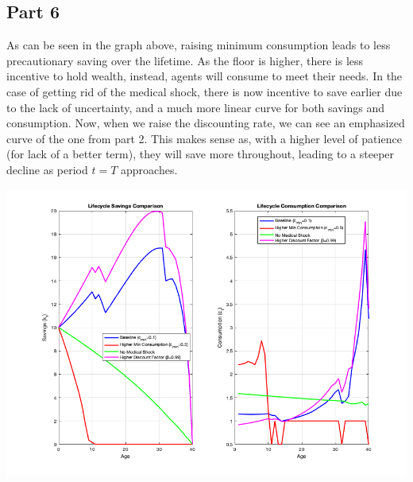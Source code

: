 \documentclass[10pt,a4paper]{article}
\begin{document}
\subsection*{Part 6}


As can be seen in the graph above, raising minimum consumption leads to less precautionary saving over the lifetime. As the floor is higher, there is less incentive to hold wealth, instead, agents will consume to meet their needs. In the case of getting rid of the medical shock, there is now incentive to save earlier due to the lack of uncertainty, and a much more linear curve for both savings and consumption. Now, when we raise the discounting rate, we can see an emphasized curve of the one from part 2. This makes sense as, with a higher level of patience (for lack of a better term), they will save more throughout, leading to a steeper decline as period $t=T$ approaches. 


\includegraphics[scale=0.5]{lifecycle_comparison.png}
\end{document}
